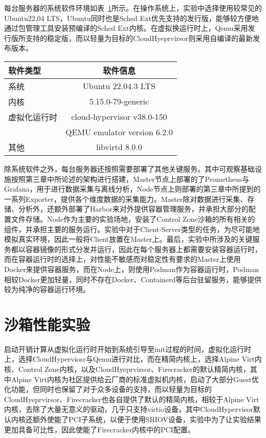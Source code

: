 每台服务器的系统软件环境如表~\ref{tab:system_env}所示。在操作系统上，实验中选择使用较常见的Ubuntu22.04 LTS，Ubuntu同时也是Sched Ext优先支持的发行版，能够较方便地通过包管理工具安装预编译的Sched Ext内核。在虚拟换运行时上，Qemu采用发行版所支持的稳定版，而以轻量为目标的CloudHyeprvirsor则采用自编译的最新发布版本。

\begin{table}
    \label{tab:system_env}
    \footnotesize%
    \setlength{\tabcolsep}{4pt}%
    \renewcommand{\arraystretch}{1.5}%
    \centering
    \begin{tabular}{lc}
        \hline
        软件类型 & 软件信息 \\
        \hline
        系统 & Ubuntu 22.04.3 LTS  \\
        内核 & 5.15.0-79-generic \\
        虚拟化运行时 & cloud-hypervisor v38.0-150 \\
                   & QEMU emulator version 6.2.0 \\
        其他        & libvirtd 8.0.0 \\
        \hline
    \end{tabular}
\end{table}

除系统软件之外，每台服务器还按照需要部署了其他关键服务。其中可观察基础设施按照第三章中所论述的架构进行搭建，Master节点上部署的了Prometheus与Grafana，用于进行数据采集与离线分析，Node节点上则部署的第三章中所提到的一系列Exporter，提供各个维度数据的采集能力。Master除对数据进行采集、存储、分析外，还额外部署了Harbor来对外提供容器管理服务，并承担大部分的配置文件存储。Node作为主要的实验场地，安装了Control Zone沙箱的所有相关的组件，并承担主要的服务运行。实验中对于Client-Server类型的任务，为尽可能地模拟真实环境，因此一般将Client放置在Master上。最后，实验中所涉及的关键服务都以容器镜像的形式分发并运行，因此在每个服务器上都需要安装容器运行时，而在容器运行时的选择上，对性能不敏感而对稳定性有要求的Master上使用Docker来提供容器服务，而在Node上，则使用Podman作为容器运行时，Podman相较Docker更加轻量，同时不存在Docker、Containerd等后台驻留服务，能够提供较为纯净的容器运行环境。

\section{沙箱性能实验}

启动开销计算从虚拟化运行时开始到系统引导至init过程的时间，虚拟化运行时上，选择CloudHyperviosr与Qemu进行对比，而在精简内核上，选择Alpine Virt内核、Control Zone内核，以及CloudHyeprvirsor、Firecracker的默认精简内核，其中Alpine Virt内核为社区提供给云厂商的标准虚拟机内核，启动了大部分Guest优化功能，但同时也保留了对于众多设备的支持，而以轻量为目标的CloudHyeprvirsor、Firecracker也各自提供了默认的精简内核，相较于Alpine Virt内核，去除了大量无意义的驱动，几乎只支持virtio设备，其中CloudHypervisor默认内核还额外使能了PCI子系统，以便于使用SRIOV设备，实验中为了让实验结果更加具备可比性，因此使能了Firecracker内核中的PCI配置。

